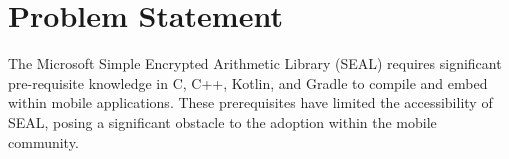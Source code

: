 \section{Problem Statement}
\label{sec:Problem Statement}
The Microsoft Simple Encrypted Arithmetic Library (SEAL) \cite{sealcrypto} requires significant pre-requisite knowledge in C, C++, Kotlin, and Gradle to compile and embed within mobile applications. These prerequisites have limited the accessibility of SEAL, posing a significant obstacle to the adoption within the mobile community.
